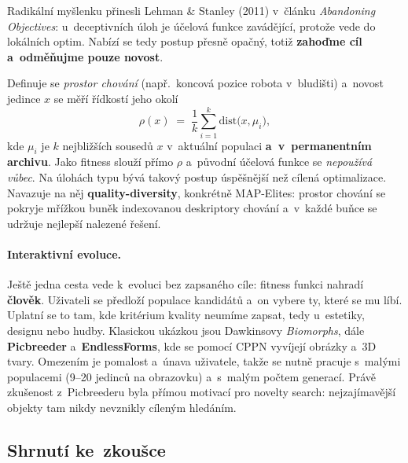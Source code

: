 \documentclass[11pt,a4paper]{article}
\theoremstyle{definition}
\begin{document}
\begin{defbox}
Radikální myšlenku přinesli Lehman \& Stanley (2011) v~článku \emph{Abandoning Objectives}:
u~deceptivních úloh je účelová funkce zavádějící, protože vede do lokálních optim.
Nabízí se tedy postup přesně opačný, totiž \textbf{zahoďme cíl a~odměňujme pouze novost}.

Definuje se \emph{prostor chování} (např.\ koncová pozice robota v~bludišti) a~novost
jedince $x$ se měří řídkostí jeho okolí
\[
\rho(x) \;=\; \frac{1}{k}\sum_{i=1}^{k} \mathrm{dist}\big(x, \mu_i\big),
\]
kde $\mu_i$ je $k$ nejbližších sousedů $x$ v~aktuální populaci \textbf{a~v~permanentním
archivu}. Jako fitness slouží přímo $\rho$ a~původní účelová funkce se \emph{nepoužívá
vůbec}. Na úlohách typu  bývá takový postup úspěšnější než cílená
optimalizace. Navazuje na něj \textbf{quality-diversity}, konkrétně MAP-Elites: prostor
chování se pokryje mřížkou buněk indexovanou deskriptory chování a~v~každé buňce se udržuje
nejlepší nalezené řešení.
\end{defbox}

\paragraph{Interaktivní evoluce.} Ještě jedna cesta vede k~evoluci bez zapsaného cíle:
fitness funkci nahradí \textbf{člověk}. Uživateli se předloží populace kandidátů a~on vybere
ty, které se mu líbí. Uplatní se to tam, kde kritérium kvality neumíme zapsat, tedy
u~estetiky, designu nebo hudby. Klasickou ukázkou jsou Dawkinsovy \emph{Biomorphs}, dále
\textbf{Picbreeder} a~\textbf{EndlessForms}, kde se pomocí CPPN vyvíjejí obrázky a~3D tvary.
Omezením je pomalost a~únava uživatele, takže se nutně pracuje s~malými populacemi
(9--20 jedinců na obrazovku) a~s~malým počtem generací. Právě zkušenost z~Picbreederu byla
přímou motivací pro novelty search: nejzajímavější objekty tam nikdy nevznikly cíleným
hledáním.

\subsection{Shrnutí ke~zkoušce}
\end{document}
